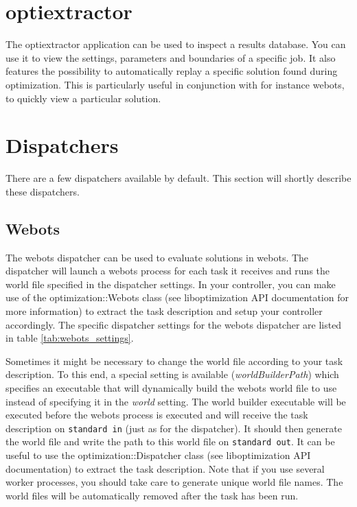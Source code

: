\documentclass{report}
\begin{document}
\section{optiextractor}\label{app:optiextractor}
The optiextractor application can be used to inspect a results database. You
can use it to view the settings, parameters and boundaries of a specific
job. It also features the possibility to automatically replay a specific
solution found during optimization. This is particularly useful in conjunction
with for instance webots, to quickly view a particular solution.

\section{Dispatchers}
There are a few dispatchers available by default. This section will shortly
describe these dispatchers.

\subsection{Webots}
The webots dispatcher can be used to evaluate solutions in webots. The
dispatcher will launch a webots process for each task it receives and runs
the world file specified in the dispatcher settings. In your controller, you
can make use of the optimization::Webots class (see liboptimization API
documentation for more information) to extract the task description and setup
your controller accordingly. The specific dispatcher settings for the webots
dispatcher are listed in table \ref{tab:webots_settings}.

Sometimes it might be necessary to change the world file according to your task
description. To this end, a special setting is available (\textit{worldBuilderPath})
which specifies an executable that will dynamically build the webots world
file to use instead of specifying it in the \textit{world} setting. The
world builder executable will be executed before the webots process is executed
and will receive the task description on \verb!standard in!
(just as for the dispatcher). It should then generate the world file and
write the path to this world file on \verb!standard out!. It can be useful
to use the optimization::Dispatcher class (see liboptimization API
documentation) to extract the task description. Note that if you use several
worker processes, you should take care to generate unique world file names.
The world files will be automatically removed after the task has been run.
\end{document}
